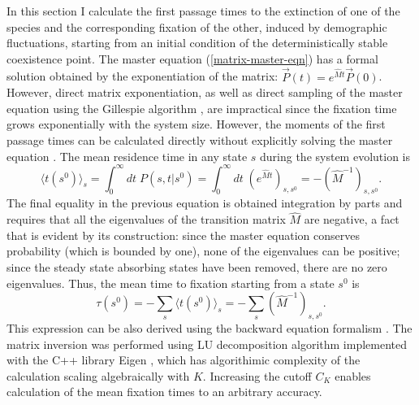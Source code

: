In this section I calculate the first passage times to the extinction of one of the species and the corresponding fixation of the other, induced by demographic fluctuations, starting from an initial condition of the deterministically stable coexistence point. 
The master equation (\ref{matrix-master-eqn}) has a formal solution obtained by the exponentiation of the matrix: $\vec{P}(t) = e^{\hat{M} t}\vec{P}(0)$. 
However, direct matrix exponentiation, as well as direct sampling of the master equation using the Gillespie algorithm \cite{Gillespie1977,Cao2006}, are impractical since the fixation time grows exponentially with the system size. %
However, the moments of the first passage times can be calculated directly without explicitly solving the master equation \cite{Grinstead2003}. 
The mean residence time in any state $s$ during the system evolution is
\begin{equation}
\langle t(s^0)\rangle_s=\int_0^\infty dt\; P(s,t|s^0)=\int_0^\infty dt \; (e^{\hat{M}t})_{s,s^0}=-(\hat{M}^{-1})_{s,s^0}. \label{residence-time}
\end{equation}
The final equality in the previous equation is obtained integration by parts and requires that all the eigenvalues of the transition matrix $\hat{M}$ are negative, a fact that is evident by its construction: since the master equation conserves probability (which is bounded by one), none of the eigenvalues can be positive; since the steady state absorbing states have been removed, there are no zero eigenvalues. 
Thus, the mean time to fixation starting from a state $s^0$ is \cite{Iyer-Biswas2015}
\begin{equation}
\tau(s^0) =-\sum_s\langle t(s^0)\rangle_s=-\sum_s \left(\hat{M}^{-1}\right)_{s,s^0}.
 \label{explicit-tau}
\end{equation}
This expression can be also derived using the backward equation formalism \cite{Iyer-Biswas2015}.
The matrix inversion was performed using LU decomposition algorithm implemented with the C++ library Eigen \cite{eigenweb}, which has algorithimic complexity of the calculation scaling algebraically with $K$.
Increasing the cutoff $C_K$ enables calculation of the mean fixation times to an arbitrary accuracy.


